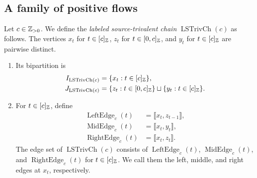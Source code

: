 \subsection{A family of positive flows}
\begin{definition}\label{def:labeled-chain}
Let $c\in\mathbb Z_{>0}$. We define the \textit{labeled source-trivalent chain} $\operatorname{LSTrivCh}(c)$ as follows.
The vertices $x_t$ for $t\in[c]_{\mathbb Z}$, $z_t$ for $t\in[0,c]_{\mathbb Z}$, and $y_t$ for $t\in[c]_{\mathbb Z}$ are pairwise distinct.
\begin{enumerate}[font=\itshape]
\item Its bipartition is
\[
\begin{aligned}
 I_{\operatorname{LSTrivCh}(c)}&=\{x_t:t\in[c]_{\mathbb Z}\},\\
 J_{\operatorname{LSTrivCh}(c)}&=
 \{z_t:t\in[0,c]_{\mathbb Z}\}\sqcup\{y_t:t\in[c]_{\mathbb Z}\}.
\end{aligned}
\]
\item For $t\in[c]_{\mathbb Z}$, define
\[
\begin{aligned}
 \operatorname{LeftEdge}_c(t)&=\llbracket x_t,z_{t-1}\rrbracket,\\
 \operatorname{MidEdge}_c(t)&=\llbracket x_t,y_t\rrbracket,\\
 \operatorname{RightEdge}_c(t)&=\llbracket x_t,z_t\rrbracket.
\end{aligned}
\]
The edge set of $\operatorname{LSTrivCh}(c)$ consists of $\operatorname{LeftEdge}_c(t)$, $\operatorname{MidEdge}_c(t)$, and $\operatorname{RightEdge}_c(t)$ for $t\in[c]_{\mathbb Z}$.
We call them the left, middle, and right edges at $x_t$, respectively.
\end{enumerate}
\end{definition}

